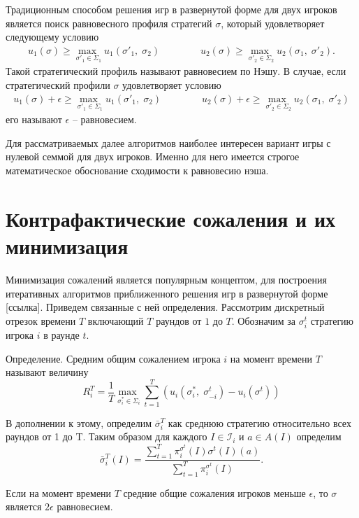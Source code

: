 Традиционным способом решения игр в развернутой форме для двух игроков является поиск равновесного профиля стратегий $\sigma$, который удовлетворяет следующему условию 
\begin{equation}
\begin{split}
	u_1(\sigma)\geq \underset{\sigma'_1\in \Sigma_1}{\max\;} u_1(\sigma'_1,\;\sigma_2) & \;\;\;\;\;\;\;\;\;\;\;\; u_2(\sigma)\geq \underset{\sigma'_2\in \Sigma_2}{\max\;} u_2(\sigma_1,\;\sigma'_2).
\end{split}
\end{equation} 
Такой стратегический профиль называют равновесием по Нэшу. В случае, если стратегический профили $\sigma$ удовлетворяет условию 
\begin{equation}
	\begin{split}
		u_1(\sigma)+\epsilon\geq \underset{\sigma'_1\in \Sigma_1}{\max\;} u_1(\sigma'_1,\;\sigma_2) & \;\;\;\;\;\;\;\;\;\;\;\; u_2(\sigma)+\epsilon\geq \underset{\sigma'_2\in \Sigma_2}{\max\;} u_2(\sigma_1,\;\sigma'_2)
	\end{split}
\end{equation}
его называют $\epsilon$ – равновесием.
\par
Для рассматриваемых далее алгоритмов наиболее интересен вариант игры с нулевой семмой для двух игроков. Именно для него имеется строгое математическое обоснование сходимости к равновесию нэша.

\section{Контрафактические сожаления и их минимизация}

Минимизация сожалений является популярным концептом, для построения итеративных алгоритмов приближенного решения игр в развернутой форме [ссылка]. Приведем связанные с ней определения. Рассмотрим дискретный отрезок времени $T$ включающий $T$ раундов от $1$ до $T$. Обозначим за $\sigma_i^t$ стратегию игрока $i$ в раунде $t$. 

Определение. Средним общим сожалением игрока $i$ на момент времени $T$ называют величину 
\begin{equation}
	R_i^T=\frac{1}{T} \underset{\sigma_i^*\in \Sigma_i}{\max\;}\sum_{t=1}^{T}(u_i(\sigma_i^* ,\;\sigma_{-i}^t)-u_i(\sigma^t))
\end{equation} 

В дополнении к этому, определим $\bar{\sigma}_i^T$ как среднюю стратегию относительно всех раундов от 1 до T. Таким образом для каждого $I \in \mathcal{I}_i$ и $a\in A(I)$ определим 
\begin{equation}
	\bar{\sigma}_i^T(I)=\frac{\sum^T_{t=1}\pi_i^{\sigma^t}(I)\sigma^t(I)(a)}{\sum_{t=1}^{T}\pi_i^{\sigma^t}(I)}.
\end{equation}
\begin{theo} Если на момент времени $T$ средние общие сожаления игроков меньше $\epsilon$, то $\sigma$ является $2\epsilon$ равновесием. 
\end{theo}

